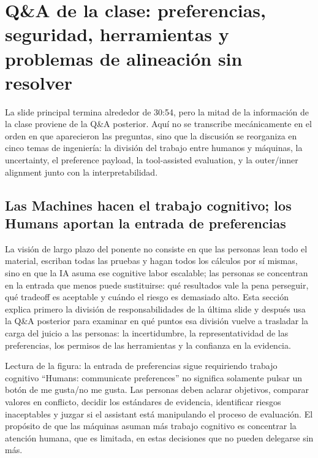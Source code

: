 \section{Q\&A de la clase: preferencias, seguridad, herramientas y problemas de alineación sin resolver}

La slide principal termina alrededor de 30:54, pero la mitad de la información de la clase proviene de la Q\&A posterior. Aquí no se transcribe mecánicamente en el orden en que aparecieron las preguntas, sino que la discusión se reorganiza en cinco temas de ingeniería: la división del trabajo entre humanos y máquinas, la uncertainty, el preference payload, la tool-assisted evaluation, y la outer/inner alignment junto con la interpretabilidad.

\subsection{Las Machines hacen el trabajo cognitivo; los Humans aportan la entrada de preferencias}

La visión de largo plazo del ponente no consiste en que las personas lean todo el material, escriban todas las pruebas y hagan todos los cálculos por sí mismas, sino en que la IA asuma ese cognitive labor escalable; las personas se concentran en la entrada que menos puede sustituirse: qué resultados vale la pena perseguir, qué tradeoff es aceptable y cuándo el riesgo es demasiado alto. Esta sección explica primero la división de responsabilidades de la última slide y después usa la Q\&A posterior para examinar en qué puntos esa división vuelve a trasladar la carga del juicio a las personas: la incertidumbre, la representatividad de las preferencias, los permisos de las herramientas y la confianza en la evidencia.


\begin{knowledgebox}{Lectura de la figura: la entrada de preferencias sigue requiriendo trabajo cognitivo}
``Humans: communicate preferences'' no significa solamente pulsar un botón de me gusta/no me gusta. Las personas deben aclarar objetivos, comparar valores en conflicto, decidir los estándares de evidencia, identificar riesgos inaceptables y juzgar si el assistant está manipulando el proceso de evaluación. El propósito de que las máquinas asuman más trabajo cognitivo es concentrar la atención humana, que es limitada, en estas decisiones que no pueden delegarse sin más.
\end{knowledgebox}

